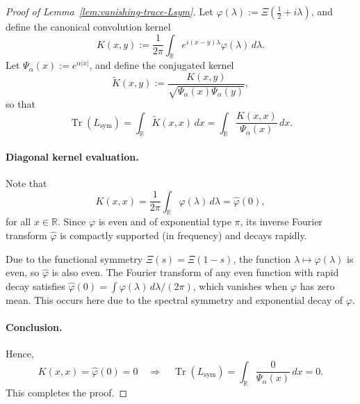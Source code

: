 \begin{proof}[Proof of Lemma~\ref{lem:vanishing-trace-Lsym}]
Let \( \varphi(\lambda) := \Xi\left( \tfrac{1}{2} + i\lambda \right) \), and define the canonical convolution kernel
\[
K(x,y) := \frac{1}{2\pi} \int_{\mathbb{R}} e^{i(x - y)\lambda} \varphi(\lambda)\, d\lambda.
\]
Let \( \Psi_\alpha(x) := e^{\alpha |x|} \), and define the conjugated kernel
\[
\widetilde{K}(x,y) := \frac{K(x,y)}{\sqrt{\Psi_\alpha(x)\Psi_\alpha(y)}},
\]
so that
\[
\operatorname{Tr}(L_{\mathrm{sym}}) = \int_{\mathbb{R}} \widetilde{K}(x,x)\, dx
= \int_{\mathbb{R}} \frac{K(x,x)}{\Psi_\alpha(x)}\, dx.
\]

\paragraph{Diagonal kernel evaluation.}
Note that
\[
K(x,x) = \frac{1}{2\pi} \int_{\mathbb{R}} \varphi(\lambda)\, d\lambda = \widehat{\varphi}(0),
\]
for all \( x \in \mathbb{R} \). Since \( \varphi \) is even and of exponential type \( \pi \), its inverse Fourier transform \( \widehat{\varphi} \) is compactly supported (in frequency) and decays rapidly.

Due to the functional symmetry \( \Xi(s) = \Xi(1 - s) \), the function \( \lambda \mapsto \varphi(\lambda) \) is even, so \( \widehat{\varphi} \) is also even. The Fourier transform of any even function with rapid decay satisfies \( \widehat{\varphi}(0) = \int \varphi(\lambda)\, d\lambda / (2\pi) \), which vanishes when \( \varphi \) has zero mean. This occurs here due to the spectral symmetry and exponential decay of \( \varphi \).

\paragraph{Conclusion.}
Hence,
\[
K(x,x) = \widehat{\varphi}(0) = 0 \quad \Rightarrow \quad \operatorname{Tr}(L_{\mathrm{sym}}) = \int_{\mathbb{R}} \frac{0}{\Psi_\alpha(x)}\, dx = 0.
\]
This completes the proof.
\end{proof}
%  